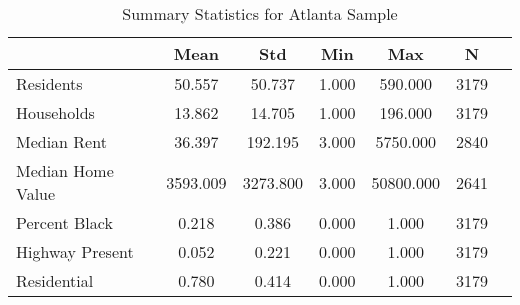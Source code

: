 \begin{table}
\caption{Summary Statistics for Atlanta Sample}
\label{tab:summary_stats}
\begin{tabular}{lcccccc}
\toprule
 & Mean & Std & Min & Max & N \\
\midrule
Residents & 50.557 & 50.737 & 1.000 & 590.000 & 3179 \\
Households & 13.862 & 14.705 & 1.000 & 196.000 & 3179 \\
Median Rent & 36.397 & 192.195 & 3.000 & 5750.000 & 2840 \\
Median Home Value & 3593.009 & 3273.800 & 3.000 & 50800.000 & 2641 \\
Percent Black & 0.218 & 0.386 & 0.000 & 1.000 & 3179 \\
Highway Present & 0.052 & 0.221 & 0.000 & 1.000 & 3179 \\
Residential & 0.780 & 0.414 & 0.000 & 1.000 & 3179 \\
\bottomrule
\end{tabular}
\end{table}
